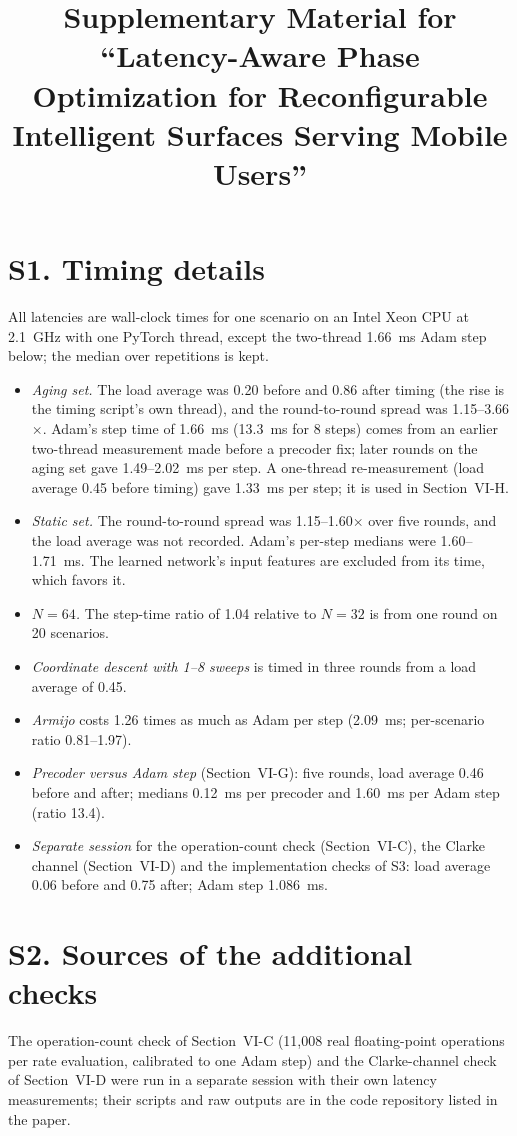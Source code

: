 \documentclass[journal,onecolumn]{IEEEtran}
\begin{document}
\title{Supplementary Material for ``Latency-Aware Phase Optimization for Reconfigurable Intelligent Surfaces Serving Mobile Users''}
\maketitle

\section*{S1. Timing details}
All latencies are wall-clock times for one scenario on an Intel Xeon CPU at 2.1~GHz with one PyTorch thread, except the two-thread 1.66~ms Adam step below; the median over repetitions is kept.
\begin{itemize}
\item \emph{Aging set.} The load average was 0.20 before and 0.86 after timing (the rise is the timing script's own thread), and the round-to-round spread was 1.15--3.66$\times$. Adam's step time of 1.66~ms (13.3~ms for 8 steps) comes from an earlier two-thread measurement made before a precoder fix; later rounds on the aging set gave 1.49--2.02~ms per step. A one-thread re-measurement (load average 0.45 before timing) gave 1.33~ms per step; it is used in Section~VI-H.
\item \emph{Static set.} The round-to-round spread was 1.15--1.60$\times$ over five rounds, and the load average was not recorded. Adam's per-step medians were 1.60--1.71~ms. The learned network's input features are excluded from its time, which favors it.
\item \emph{$N=64$.} The step-time ratio of 1.04 relative to $N=32$ is from one round on 20 scenarios.
\item \emph{Coordinate descent with 1--8 sweeps} is timed in three rounds from a load average of 0.45.
\item \emph{Armijo} costs 1.26 times as much as Adam per step (2.09~ms; per-scenario ratio 0.81--1.97).
\item \emph{Precoder versus Adam step} (Section~VI-G): five rounds, load average 0.46 before and after; medians 0.12~ms per precoder and 1.60~ms per Adam step (ratio 13.4).
\item \emph{Separate session} for the operation-count check (Section~VI-C), the Clarke channel (Section~VI-D) and the implementation checks of S3: load average 0.06 before and 0.75 after; Adam step 1.086~ms.
\end{itemize}

\section*{S2. Sources of the additional checks}
The operation-count check of Section~VI-C (11{,}008 real floating-point operations per rate evaluation, calibrated to one Adam step) and the Clarke-channel check of Section~VI-D were run in a separate session with their own latency measurements; their scripts and raw outputs are in the code repository listed in the paper.
\end{document}
